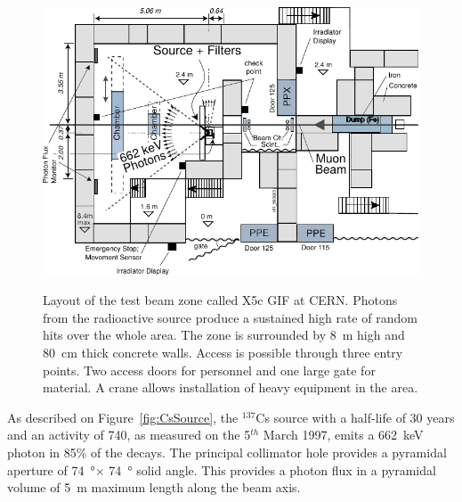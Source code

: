 			\begin{figure}[!h]
				\begin{center}
					\includegraphics[width = \plotwidth]{fig/GIF.pdf}\\
					\caption{\label{fig:GIFLayout} Layout of the test beam zone called X5c GIF at CERN. Photons from the radioactive source produce a sustained high rate of random hits over the whole area. The zone is surrounded by \SI{8}{\meter} high and \SI{80}{\cm} thick concrete walls. Access is possible through three entry points. Two access doors for personnel and one large gate for material. A crane allows installation of heavy equipment in the area.}
				\end{center}
			\end{figure}
			
			As described on Figure~\ref{fig:CsSource}, the $^{137}$Cs source with a half-life of 30 years and an activity of \SI{740}{\GBq}, as measured on the 5$^{th}$ March 1997, emits a \SI{662}{\keV} photon in 85\% of the decays. The principal collimator hole provides a pyramidal aperture of \SI{74}{\degree}$\times$ \SI{74}{\degree} solid angle. This provides a photon flux in a pyramidal volume of \SI{5}{\meter} maximum length along the beam axis.

